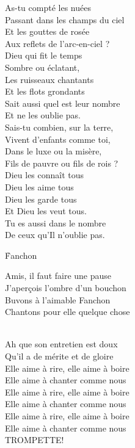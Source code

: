 \documentclass{novel}
\begin{document}
{\begin{minipage}[t][0.5\textheight][t]{\textwidth}
\begin{multicols}{2}
As-tu compté les nuées \\
Passant dans les champs du ciel \\
Et les gouttes de rosée \\
Aux reflets de l’arc-en-ciel ? \\
Dieu qui fit le temps \\
Sombre ou éclatant, \\
Les ruisseaux chantants \\
Et les flots grondants \\
Sait aussi quel est leur nombre \\
Et ne les oublie pas. \\

Sais-tu combien, sur la terre, \\
Vivent d’enfants comme toi, \\
Dans le luxe ou la misère, \\
Fils de pauvre ou fils de rois ? \\
Dieu les connaît tous \\
Dieu les aime tous \\
Dieu les garde tous \\
Et Dieu les veut tous. \\
Tu es aussi dans le nombre \\
De ceux qu’Il n’oublie pas.

\end{multicols}
\end{minipage}
}

\newpage
\normalsize
\h*{Fanchon}

Amis, il faut faire une pause \\
J'aperçois l'ombre d'un bouchon \\
Buvons à l'aimable Fanchon \\
Chantons pour elle quelque chose \\

\begin{bfseries}
[Refrain:]\\
Ah que son entretien est doux \\
Qu'il a de mérite et de gloire \\
Elle aime à rire, elle aime à boire \\
Elle aime à chanter comme nous \\
Elle aime à rire, elle aime à boire \\
Elle aime à chanter comme nous \\
Elle aime à rire, elle aime à boire \\
Elle aime à chanter comme nous \\
TROMPETTE! \\
\end{bfseries}
\end{document}
